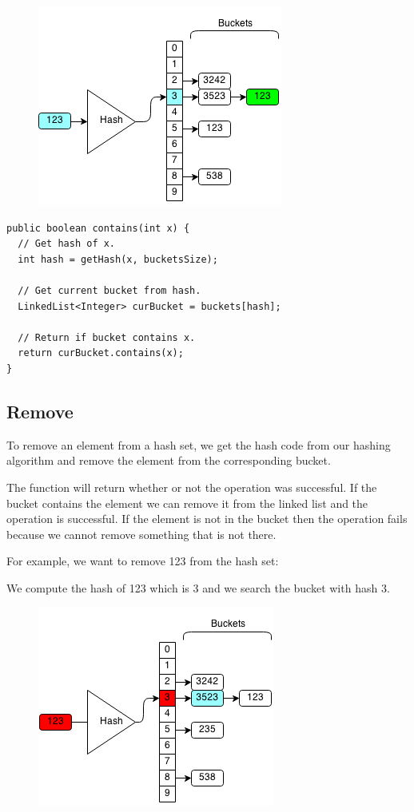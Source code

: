 \documentclass[11pt,oneside]{book}
\makeatletter
\def\maxwidth#1{\ifdim\Gin@nat@width>#1 #1\else\Gin@nat@width\fi}
\makeatother
\begin{document}
\vspace{5px}\begin{figure}[H]\centering
        \includegraphics[width=0.66\maxwidth{\textwidth}]{hashsetcontains3.png}
        \end{figure}

\begin{lstlisting}
public boolean contains(int x) {
  // Get hash of x.
  int hash = getHash(x, bucketsSize);
  
  // Get current bucket from hash.
  LinkedList<Integer> curBucket = buckets[hash];
  
  // Return if bucket contains x.
  return curBucket.contains(x);
}
\end{lstlisting}

\subsection{Remove}

To remove an element from a hash set, we get the hash code from our hashing algorithm and remove the element from the corresponding bucket.

The function will return whether or not the operation was successful. If the bucket contains the element we can remove it from the linked list and the operation is successful. If the element is not in the bucket then the operation fails because we cannot remove something that is not there.

For example, we want to remove 123 from the hash set:

We compute the hash of 123 which is 3 and we search the bucket with hash 3.

\vspace{5px}\begin{figure}[H]\centering
        \includegraphics[width=0.66\maxwidth{\textwidth}]{hashsetrem.png}
        \end{figure}
\end{document}
